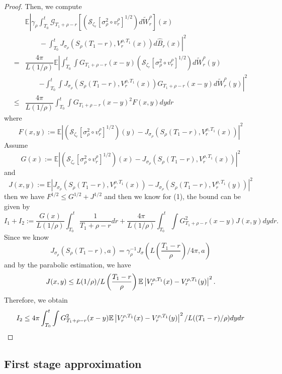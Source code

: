 \begin{proof}
Then, we compute
\[
\begin{aligned}
&\mathbb{E}\left|
\gamma_{\rho}\int_{T_0}^t \mathcal{G}_{T_1+\rho-r}\left[\left(\mathcal{S}_{\zeta_r}[\sigma_{\rho}^2\circ v_r^{\rho}]^{1/2}\right)d\widetilde{W}_r^{\rho}\right](x)\right.\\ &\qquad- \left.\int_{T_0}^t J_{\sigma_{\rho}}(S_{\rho}(T_1-r),V_r^{\rho,T_1}(x))d\widehat{B}_r(x) 
\right|^2 \\
= &\dfrac{4\pi}{L(1/\rho)}\mathbb{E}\left\lvert\int_{T_0}^t \int G_{T_1+\rho-r}(x-y)\left(\mathcal{S}_{\zeta_r}[\sigma_{\rho}^2\circ v_r^{\rho}]^{1/2}\right)d\widetilde{W}_r^{\rho}(y) \right. \\
&\qquad\left. -\int_{T_0}^t\int J_{\sigma_{\rho}}(S_{\rho}(T_1-r),V_r^{\rho,T_1}(x))G_{T_1+\rho-r}(x-y)d\widetilde{W}_r^{\rho}(y) 
\right\rvert^2 \\
\leq& \dfrac{4\pi}{L(1/\rho)}\int_{T_0}^t\int G_{T_1+\rho-r}(x-y)^2F(x,y)dydr
\end{aligned}
\tag{1}
\]
where
\[
F(x,y):= \mathbb{E}\left|\left(\mathcal{S}_{\zeta_r}[\sigma_{\rho}^2\circ v_r^{\rho}]^{1/2}\right)(y) - J_{\sigma_{\rho}}(S_{\rho}(T_1-r),V_r^{\rho,T_1}(x))\right|^2
\]
Assume
\[
G(x):=\mathbb{E}\left|\left(\mathcal{S}_{\zeta_r}[\sigma_{\rho}^2\circ v_r^{\rho}]^{1/2}\right)(x) - J_{\sigma_{\rho}}(S_{\rho}(T_1-r),V_r^{\rho,T_1}(x))\right|^2
\]
and
\[
J(x,y) :=\mathbb{E}\left|J_{\sigma_{\rho}}(S_{\rho}(T_1-r),V_r^{\rho,T_1}(x)) - J_{\sigma_{\rho}}(S_{\rho}(T_1-r),V_r^{\rho,T_1}(y))\right|^2
\]
then we have $F^{1/2} \leq G^{1/2} + J^{1/2}$ and then we know for (1), the bound can be given by
\[
I_1 + I_2:= \dfrac{G(x)}{L(1/\rho)}\int_{T_0}^t \dfrac{1}{T_1+\rho-r}dr + \dfrac{4\pi}{L(1/\rho)}\int_{T_0}^t\int G_{T_1+\rho-r}^{2}(x-y)J(x,y)dydr.
\]
Since we know
\[
J_{\sigma_{\rho}}(S_{\rho}(T_1-r),a) = \gamma_{\rho}^{-1}J_{\sigma}\left(L\left(\dfrac{T_1-r}{\rho}\right)/4\pi,a\right)
\]
and by the parabolic estimation, we have
\[
J(x,y) \leq L(1/\rho)/L\left(\dfrac{T_1-r}{\rho}\right)\mathbb{E}\left|V_r^{\rho,T_1}(x)-V_r^{\rho,T_1}(y)\right|^2.
\]
Therefore, we obtain
\[
I_2 \leq 4\pi\int_{T_0}^t\int G_{T_1+\rho-r}^2(x-y)\mathbb{E}\left|V_r^{\rho,T_1}(x)-V_r^{\rho,T_1}(y)\right|^2/L((T_1-r)/\rho) dydr
\]
\end{proof}

\subsection{First stage approximation}

